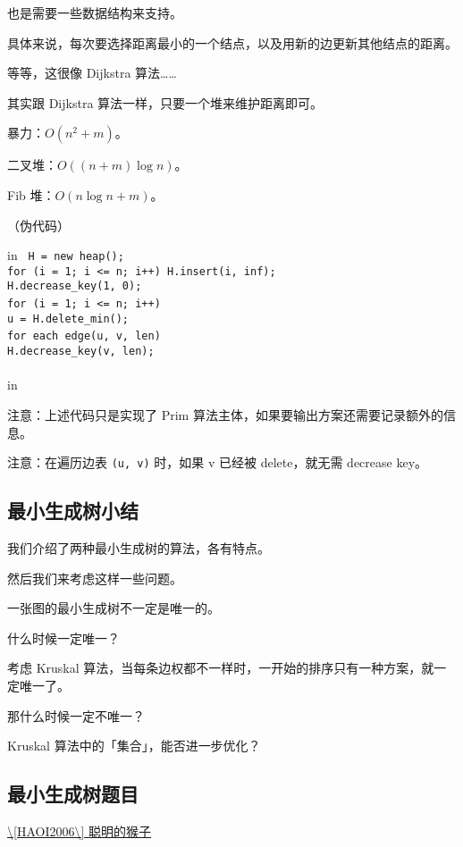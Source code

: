 也是需要一些数据结构来支持。

具体来说，每次要选择距离最小的一个结点，以及用新的边更新其他结点的距离。

等等，这很像 Dijkstra 算法……

其实跟 Dijkstra 算法一样，只要一个堆来维护距离即可。

暴力：$O(n^2+m)$。

二叉堆：$O((n+m) \log n)$。

Fib 堆：$O(n \log n + m)$。

（伪代码）

 in
\texttt{
H = new heap();\\for (i = 1; i <= n; i++) H.insert(i, inf);\\H.decrease_key(1, 0);\\for (i = 1; i <= n; i++) {\\	u = H.delete_min();\\	for each edge(u, v, len) {\\		H.decrease_key(v, len);\\	}\\}}
 in

注意：上述代码只是实现了 Prim 算法主体，如果要输出方案还需要记录额外的信息。

注意：在遍历边表 \texttt{(u, v)} 时，如果 v 已经被 delete，就无需 decrease key。

\subsection{最小生成树小结}

我们介绍了两种最小生成树的算法，各有特点。

然后我们来考虑这样一些问题。

一张图的最小生成树不一定是唯一的。

什么时候一定唯一？

考虑 Kruskal 算法，当每条边权都不一样时，一开始的排序只有一种方案，就一定唯一了。

那什么时候一定不唯一？

Kruskal 算法中的「集合」，能否进一步优化？

\subsection{最小生成树题目}

\href{https://www.lydsy.com/JudgeOnline/problem.php?id=2429}{\textbackslash{}[HAOI2006\textbackslash{}] 聪明的猴子}

